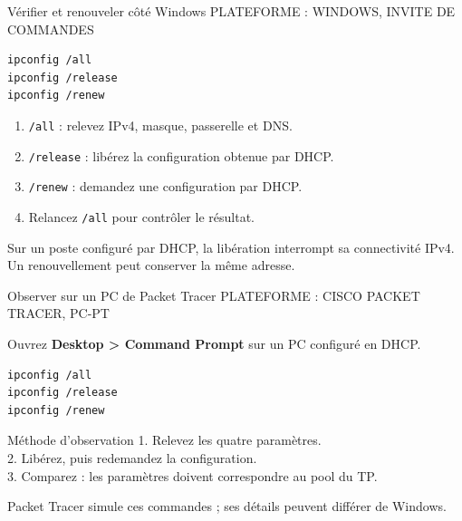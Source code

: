 \documentclass[aspectratio=169,11pt]{beamer}
\newcommand{\etiquette}[1]{{\color{or}\small\MakeUppercase{#1}}}
\newenvironment{schema}{%
  \begin{beamercolorbox}[sep=8pt,rounded=true]{block body}
  \centering\begin{tikzpicture}[>=Stealth]
}{\end{tikzpicture}\end{beamercolorbox}}
\begin{document}

\begin{frame}[fragile]{Vérifier et renouveler côté Windows}
  \etiquette{Plateforme : Windows, invite de commandes}
  \begin{lstlisting}[style=webcode,language={}]
ipconfig /all
ipconfig /release
ipconfig /renew
\end{lstlisting}
  \begin{enumerate}
    \item \texttt{/all} : relevez IPv4, masque, passerelle et DNS.
    \item \texttt{/release} : libérez la configuration obtenue par DHCP.
    \item \texttt{/renew} : demandez une configuration par DHCP.
    \item Relancez \texttt{/all} pour contrôler le résultat.
  \end{enumerate}
  \small Sur un poste configuré par DHCP, la libération interrompt sa connectivité IPv4.
  Un renouvellement peut conserver la même adresse.
\end{frame}

\begin{frame}[fragile]{Observer sur un PC de Packet Tracer}
  \etiquette{Plateforme : Cisco Packet Tracer, PC-PT}\par
  Ouvrez \textbf{Desktop > Command Prompt} sur un PC configuré en DHCP.
  \begin{lstlisting}[style=webcode,language={}]
ipconfig /all
ipconfig /release
ipconfig /renew
\end{lstlisting}
  \begin{block}{Méthode d'observation}
    1. Relevez les quatre paramètres.\\
    2. Libérez, puis redemandez la configuration.\\
    3. Comparez : les paramètres doivent correspondre au pool du TP.
  \end{block}
  \small Packet Tracer simule ces commandes ; ses détails peuvent différer de Windows.
\end{frame}
\end{document}
